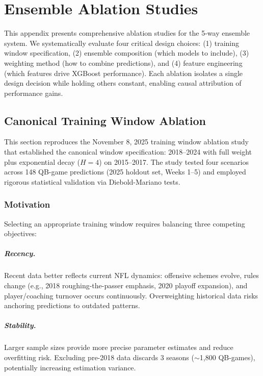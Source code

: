 \chapter{Ensemble Ablation Studies}
\label{app:ensemble-ablation}

This appendix presents comprehensive ablation studies for the 5-way ensemble system. We systematically evaluate four critical design choices: (1) training window specification, (2) ensemble composition (which models to include), (3) weighting method (how to combine predictions), and (4) feature engineering (which features drive XGBoost performance). Each ablation isolates a single design decision while holding others constant, enabling causal attribution of performance gains.

\section{Canonical Training Window Ablation}
\label{app:training-window-ablation}

This section reproduces the November 8, 2025 training window ablation study that established the canonical window specification: 2018--2024 with full weight plus exponential decay ($H=4$) on 2015--2017. The study tested four scenarios across 148 QB-game predictions (2025 holdout set, Weeks 1--5) and employed rigorous statistical validation via Diebold-Mariano tests.

\subsection{Motivation}

Selecting an appropriate training window requires balancing three competing objectives:

\paragraph{Recency.}
Recent data better reflects current NFL dynamics: offensive schemes evolve, rules change (e.g., 2018 roughing-the-passer emphasis, 2020 playoff expansion), and player/coaching turnover occurs continuously. Overweighting historical data risks anchoring predictions to outdated patterns.

\paragraph{Stability.}
Larger sample sizes provide more precise parameter estimates and reduce overfitting risk. Excluding pre-2018 data discards 3 seasons ($\sim$1,800 QB-games), potentially increasing estimation variance.

